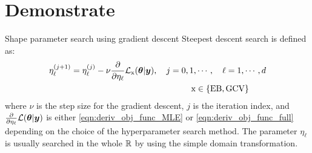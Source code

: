 \documentclass[handout, 10pt,compress,xcolor={usenames,dvipsnames}]{beamer} %
\newcommand{\bm}[1]{\boldsymbol{#1}}
\newcommand{\MLE}{\textup{EB}}
\newcommand{\GCV}{\textup{GCV}}
\renewcommand{\vtheta}{{\bm{\theta}}}
\begin{document}
\section{Demonstrate}





\begin{frame}{Shape parameter search using gradient descent}
Steepest descent search is defined as:
\begin{align*}
\eta^{(j+1)}_\ell &= \eta^{(j)}_\ell - \nu \frac{\partial}{\partial \eta_\ell} \mathcal{L}_{\bm{\textup{x}}}(\vtheta | \vy), \quad j=0,1,\cdots, \quad \ell = 1, \cdots, d \\
& \hspace{5cm} \bm{\textup{x}} \in \{\MLE, \GCV\}
\end{align*}
where $\nu$ is the step size for the gradient descent, $j$ is the iteration index, and $\frac{\partial}{\partial \eta_\ell} \mathcal{L}(\vtheta | \vy)$ is either \eqref{eqn:deriv_obj_func_MLE} or \eqref{eqn:deriv_obj_func_full} depending on the choice of the hyperparameter search method. The parameter $\eta_\ell$ is usually searched in the whole $\mathbb{R}$ by using the simple domain transformation.
\end{frame}
\end{document}

